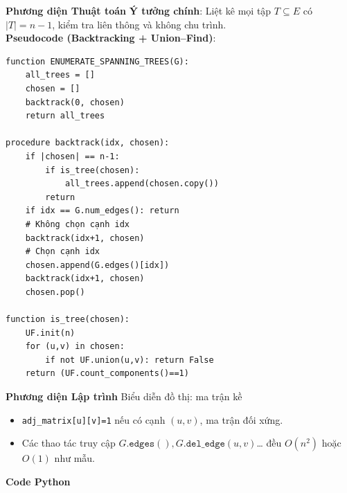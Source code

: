 \documentclass[a4paper,12pt]{article}
\begin{document}
\textbf{Phương diện Thuật toán}
\textbf{Ý tưởng chính}: Liệt kê mọi tập $T\subseteq E$ có $|T|=n-1$, kiểm tra liên thông và không chu trình.\\
\medskip
\textbf{Pseudocode (Backtracking + Union–Find)}:
\begin{verbatim}
function ENUMERATE_SPANNING_TREES(G):
    all_trees = []
    chosen = []
    backtrack(0, chosen)
    return all_trees

procedure backtrack(idx, chosen):
    if |chosen| == n-1:
        if is_tree(chosen):
            all_trees.append(chosen.copy())
        return
    if idx == G.num_edges(): return
    # Không chọn cạnh idx
    backtrack(idx+1, chosen)
    # Chọn cạnh idx
    chosen.append(G.edges()[idx])
    backtrack(idx+1, chosen)
    chosen.pop()

function is_tree(chosen):
    UF.init(n)
    for (u,v) in chosen:
        if not UF.union(u,v): return False
    return (UF.count_components()==1)
\end{verbatim}

\textbf{Phương diện Lập trình}
Biểu diễn đồ thị: ma trận kề
\begin{itemize}
  \item \texttt{adj\_matrix[u][v]=1} nếu có cạnh $(u,v)$, ma trận đối xứng.
  \item Các thao tác truy cập $G.\texttt{edges}(), G.\texttt{del\_edge}(u,v)$… đều $O(n^2)$ hoặc $O(1)$ như mẫu.
\end{itemize}

\textbf{Code Python}
\end{document}
